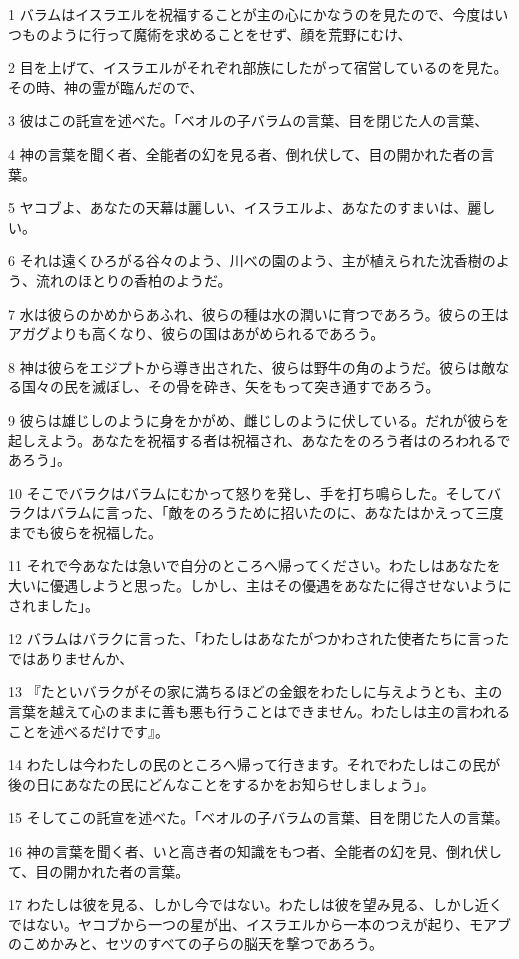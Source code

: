 \par 1 バラムはイスラエルを祝福することが主の心にかなうのを見たので、今度はいつものように行って魔術を求めることをせず、顔を荒野にむけ、
\par 2 目を上げて、イスラエルがそれぞれ部族にしたがって宿営しているのを見た。その時、神の霊が臨んだので、
\par 3 彼はこの託宣を述べた。「ベオルの子バラムの言葉、目を閉じた人の言葉、
\par 4 神の言葉を聞く者、全能者の幻を見る者、倒れ伏して、目の開かれた者の言葉。
\par 5 ヤコブよ、あなたの天幕は麗しい、イスラエルよ、あなたのすまいは、麗しい。
\par 6 それは遠くひろがる谷々のよう、川べの園のよう、主が植えられた沈香樹のよう、流れのほとりの香柏のようだ。
\par 7 水は彼らのかめからあふれ、彼らの種は水の潤いに育つであろう。彼らの王はアガグよりも高くなり、彼らの国はあがめられるであろう。
\par 8 神は彼らをエジプトから導き出された、彼らは野牛の角のようだ。彼らは敵なる国々の民を滅ぼし、その骨を砕き、矢をもって突き通すであろう。
\par 9 彼らは雄じしのように身をかがめ、雌じしのように伏している。だれが彼らを起しえよう。あなたを祝福する者は祝福され、あなたをのろう者はのろわれるであろう」。
\par 10 そこでバラクはバラムにむかって怒りを発し、手を打ち鳴らした。そしてバラクはバラムに言った、「敵をのろうために招いたのに、あなたはかえって三度までも彼らを祝福した。
\par 11 それで今あなたは急いで自分のところへ帰ってください。わたしはあなたを大いに優遇しようと思った。しかし、主はその優遇をあなたに得させないようにされました」。
\par 12 バラムはバラクに言った、「わたしはあなたがつかわされた使者たちに言ったではありませんか、
\par 13 『たといバラクがその家に満ちるほどの金銀をわたしに与えようとも、主の言葉を越えて心のままに善も悪も行うことはできません。わたしは主の言われることを述べるだけです』。
\par 14 わたしは今わたしの民のところへ帰って行きます。それでわたしはこの民が後の日にあなたの民にどんなことをするかをお知らせしましょう」。
\par 15 そしてこの託宣を述べた。「ベオルの子バラムの言葉、目を閉じた人の言葉。
\par 16 神の言葉を聞く者、いと高き者の知識をもつ者、全能者の幻を見、倒れ伏して、目の開かれた者の言葉。
\par 17 わたしは彼を見る、しかし今ではない。わたしは彼を望み見る、しかし近くではない。ヤコブから一つの星が出、イスラエルから一本のつえが起り、モアブのこめかみと、セツのすべての子らの脳天を撃つであろう。
